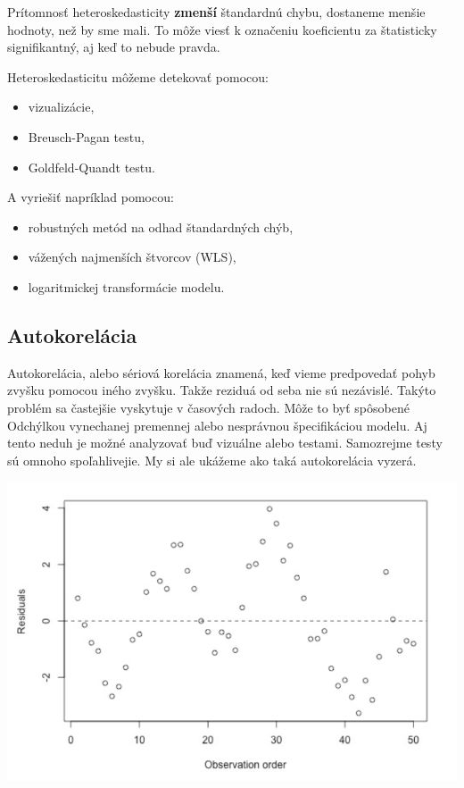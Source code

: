 Prítomnosť heteroskedasticity \textbf{zmenší} štandardnú chybu,
dostaneme menšie hodnoty, než by sme mali. To môže viesť k označeniu
koeficientu za štatisticky signifikantný, aj keď to nebude pravda.

Heteroskedasticitu môžeme detekovať pomocou:

\begin{itemize}
\tightlist
\item
  vizualizácie,
\item
  Breusch-Pagan testu,
\item
  Goldfeld-Quandt testu.
\end{itemize}

A vyriešiť napríklad pomocou:

\begin{itemize}
\tightlist
\item
  robustných metód na odhad štandardných chýb,
\item
  vážených najmenších štvorcov (WLS),
\item
  logaritmickej transformácie modelu.
\end{itemize}

\hypertarget{autokoreluxe1cia}{%
\subsection{Autokorelácia}\label{autokoreluxe1cia}}

Autokorelácia, alebo sériová korelácia znamená, keď vieme predpovedať
pohyb zvyšku pomocou iného zvyšku. Takže reziduá od seba nie sú
nezávislé. Takýto problém sa častejšie vyskytuje v časových radoch. Môže
to byť spôsobené Odchýlkou vynechanej premennej alebo nesprávnou
špecifikáciou modelu. Aj tento neduh je možné analyzovať buď vizuálne
alebo testami. Samozrejme testy sú omnoho spoľahlivejie. My si ale
ukážeme ako taká autokorelácia vyzerá.

\begin{center}

\includegraphics{diplomka obrazky/9.png}

\end{center}

